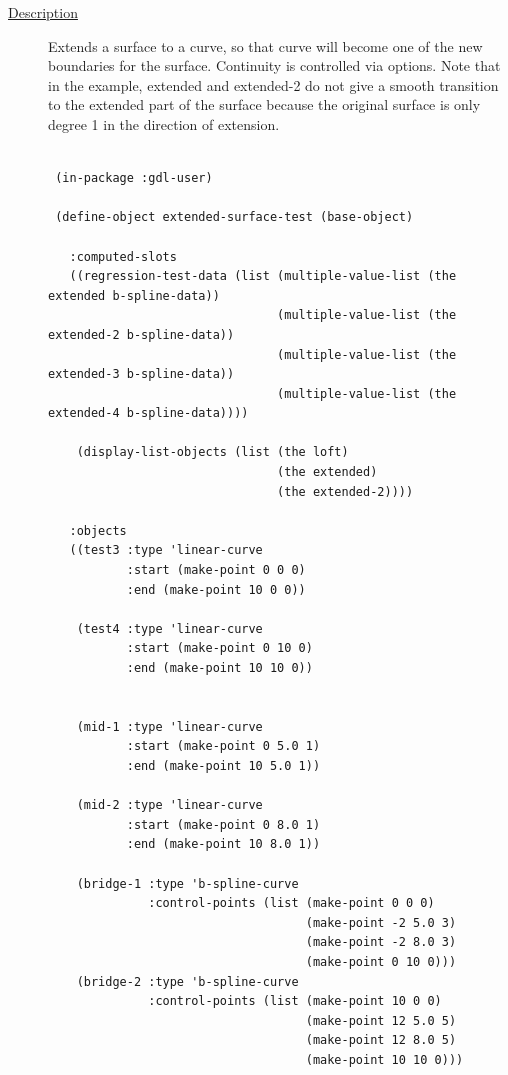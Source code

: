 \documentclass [11pt]{book}
\begin{document}
\begin{itemize}
\begin{description}
\item [
\underline{Description}]


Extends a surface to a curve, so that curve will 
become one of the new boundaries for the surface. Continuity is controlled via
options. Note that in the example, extended and extended-2 do not give a smooth
transition to the extended part of the surface because the original surface
is only degree 1 in the direction of extension.



\end{description}




\begin{figure}
\begin{lrbox}{\boxedverb}
\begin{minipage}{\linewidth}
{\small

\begin{verbatim}

 (in-package :gdl-user)
                   
 (define-object extended-surface-test (base-object)
  
   :computed-slots
   ((regression-test-data (list (multiple-value-list (the extended b-spline-data))
                                (multiple-value-list (the extended-2 b-spline-data))
                                (multiple-value-list (the extended-3 b-spline-data))
                                (multiple-value-list (the extended-4 b-spline-data))))
   
    (display-list-objects (list (the loft)
                                (the extended)
                                (the extended-2))))
  
   :objects
   ((test3 :type 'linear-curve 
           :start (make-point 0 0 0) 
           :end (make-point 10 0 0))
   
    (test4 :type 'linear-curve
           :start (make-point 0 10 0) 
           :end (make-point 10 10 0))
   
   
    (mid-1 :type 'linear-curve
           :start (make-point 0 5.0 1)
           :end (make-point 10 5.0 1))
   
    (mid-2 :type 'linear-curve
           :start (make-point 0 8.0 1)
           :end (make-point 10 8.0 1))
   
    (bridge-1 :type 'b-spline-curve
              :control-points (list (make-point 0 0 0)
                                    (make-point -2 5.0 3) 
                                    (make-point -2 8.0 3) 
                                    (make-point 0 10 0)))       
    (bridge-2 :type 'b-spline-curve
              :control-points (list (make-point 10 0 0)
                                    (make-point 12 5.0 5) 
                                    (make-point 12 8.0 5) 
                                    (make-point 10 10 0)))      


\end{verbatim}}
\end{minipage}
\end{lrbox}
\end{figure}
\end{itemize}
\end{document}
